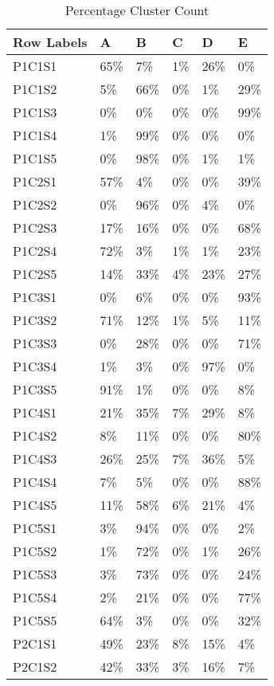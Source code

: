 \begin{longtable}{|l|l|l|l|l|l|}
\caption{Percentage Cluster Count}
\label{my-label}\\
\hline
Row Labels & A & B & C & D & E \\ \hline
\endfirsthead
\endhead
%
P1C1S1 & 65\% & 7\% & 1\% & 26\% & 0\% \\ \hline
P1C1S2 & 5\% & 66\% & 0\% & 1\% & 29\% \\ \hline
P1C1S3 & 0\% & 0\% & 0\% & 0\% & 99\% \\ \hline
P1C1S4 & 1\% & 99\% & 0\% & 0\% & 0\% \\ \hline
P1C1S5 & 0\% & 98\% & 0\% & 1\% & 1\% \\ \hline
P1C2S1 & 57\% & 4\% & 0\% & 0\% & 39\% \\ \hline
P1C2S2 & 0\% & 96\% & 0\% & 4\% & 0\% \\ \hline
P1C2S3 & 17\% & 16\% & 0\% & 0\% & 68\% \\ \hline
P1C2S4 & 72\% & 3\% & 1\% & 1\% & 23\% \\ \hline
P1C2S5 & 14\% & 33\% & 4\% & 23\% & 27\% \\ \hline
P1C3S1 & 0\% & 6\% & 0\% & 0\% & 93\% \\ \hline
P1C3S2 & 71\% & 12\% & 1\% & 5\% & 11\% \\ \hline
P1C3S3 & 0\% & 28\% & 0\% & 0\% & 71\% \\ \hline
P1C3S4 & 1\% & 3\% & 0\% & 97\% & 0\% \\ \hline
P1C3S5 & 91\% & 1\% & 0\% & 0\% & 8\% \\ \hline
P1C4S1 & 21\% & 35\% & 7\% & 29\% & 8\% \\ \hline
P1C4S2 & 8\% & 11\% & 0\% & 0\% & 80\% \\ \hline
P1C4S3 & 26\% & 25\% & 7\% & 36\% & 5\% \\ \hline
P1C4S4 & 7\% & 5\% & 0\% & 0\% & 88\% \\ \hline
P1C4S5 & 11\% & 58\% & 6\% & 21\% & 4\% \\ \hline
P1C5S1 & 3\% & 94\% & 0\% & 0\% & 2\% \\ \hline
P1C5S2 & 1\% & 72\% & 0\% & 1\% & 26\% \\ \hline
P1C5S3 & 3\% & 73\% & 0\% & 0\% & 24\% \\ \hline
P1C5S4 & 2\% & 21\% & 0\% & 0\% & 77\% \\ \hline
P1C5S5 & 64\% & 3\% & 0\% & 0\% & 32\% \\ \hline
P2C1S1 & 49\% & 23\% & 8\% & 15\% & 4\% \\ \hline
P2C1S2 & 42\% & 33\% & 3\% & 16\% & 7\% \\ \hline

\end{longtable}
